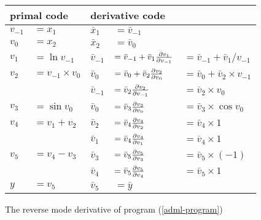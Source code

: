 \documentclass[12pt]{article}
\begin{document}
\begin{figure}[t]
\center
\begin{tabular}[t]{ll|lll}

  \multicolumn{2}{l|}{primal code}
  &
  \multicolumn{3}{l}{derivative code}
  \\

  \hline

  $v_{-1}$ & $= x_1$
  &
  $\bar{x}_1$ & $= \bar{v}_{-1}$
  \\
  
  $v_{0}$ & $= x_2$
  &
  $\bar{x}_2$ & $= \bar{v}_{0}$
  \\

  \hline

  $v_1$ & $= \ln{v_{-1}}$
  &
  \(\bar{v}_{-1}\)
  &
  \(= \bar{v}_{-1} + \bar{v}_{1} \frac{\partial v_{1}}{\partial v_{-1}}\)
  &
  \(= \bar{v}_{-1} + \bar{v}_1 / v_{-1}
  \) \\

  $v_2$ & $= v_{-1} \times v_0$
  &
  \(\bar{v}_0\)
  &
  \(= \bar{v}_0 + \bar{v}_{2} \frac{\partial v_{2}}{\partial v_{0}}\)
  &
  \(= \bar{v}_0 + \bar{v}_2 \times v_{-1}
  \) \\

  &
  &
  \(\bar{v}_{-1}\)
  &
  \(= \bar{v}_{2} \frac{\partial v_{2}}{\partial v_{-1}}\)
  &
  \(
  = \bar{v}_2 \times v_{0}
  \) \\

  $v_3$ & $= \sin{v_0}$
  &
  \(\bar{v}_0\)
  &
  \(= \bar{v}_{3} \frac{\partial v_{3}}{\partial v_{0}}\)
  &
  \(
  = \bar{v}_3 \times \cos v_0
  \) \\

  $v_4$ & $= v_1 + v_2$
  &
  \(\bar{v}_2\)
  &
  \(= \bar{v}_{4} \frac{\partial v_{4}}{\partial v_{2}}\)
  &
  \(
  = \bar{v}_4 \times 1
  \) \\

  &
  &
  \(\bar{v}_1\)
  &
  \(= \bar{v}_{4} \frac{\partial v_{4}}{\partial v_{1}}\)
  &
  \(
  = \bar{v}_4 \times 1
  \) \\

  $v_5$ & $= v_4 - v_3$
  &
  \(\bar{v}_3\)
  &
  \(= \bar{v}_{5} \frac{\partial v_{5}}{\partial v_{3}}\)
  &
  \(
  = \bar{v}_5 \times (-1)
  \) \\
  
  &
  &
  \(\bar{v}_4\)
  &
  \(= \bar{v}_{5} \frac{\partial v_{5}}{\partial v_{4}}\)
  &
  \(
  = \bar{v}_5 \times 1
  \) \\
  
  \hline

  $y$ & $= v_5$
  &
  $\bar{v}_5$ & $= \bar{y}$
  \\

\end{tabular}
\caption{\label{adml-diff} The reverse mode derivative of program
  (\ref{adml-program})}
\end{figure}
\end{document}
